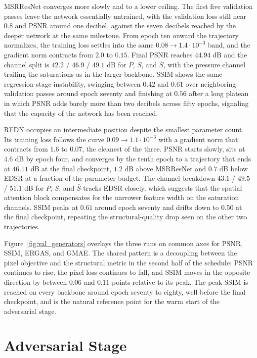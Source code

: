 MSRResNet converges more slowly and to a lower ceiling. The first five validation passes leave the network essentially untrained, with the validation loss still near $0.8$ and PSNR around one decibel, against the seven decibels reached by the deeper network at the same milestone. From epoch ten onward the trajectory normalizes, the training loss settles into the same $0.08 \to 1.4 \cdot 10^{-3}$ band, and the gradient norm contracts from $2.0$ to $0.15$. Final PSNR reaches $44.94$ dB and the channel split is $42.2$ / $46.9$ / $49.1$ dB for $P$, $S$, and $\bar{S}$, with the pressure channel trailing the saturations as in the larger backbone. SSIM shows the same regression-stage instability, swinging between $0.42$ and $0.61$ over neighboring validation passes around epoch seventy and finishing at $0.56$ after a long plateau in which PSNR adds barely more than two decibels across fifty epochs, signaling that the capacity of the network has been reached.

RFDN occupies an intermediate position despite the smallest parameter count. Its training loss follows the curve $0.09 \to 1.1 \cdot 10^{-3}$ with a gradient norm that contracts from $1.6$ to $0.07$, the cleanest of the three. PSNR starts slowly, sits at $4.6$ dB by epoch four, and converges by the tenth epoch to a trajectory that ends at $46.11$ dB at the final checkpoint, $1.2$ dB above MSRResNet and $0.7$ dB below EDSR at a fraction of the parameter budget. The channel breakdown $43.1$ / $49.5$ / $51.1$ dB for $P$, $S$, and $\bar{S}$ tracks EDSR closely, which suggests that the spatial attention block compensates for the narrower feature width on the saturation channels. SSIM peaks at $0.61$ around epoch seventy and drifts down to $0.50$ at the final checkpoint, repeating the structural-quality drop seen on the other two trajectories.

Figure~\ref{fig:val_generators} overlays the three runs on common axes for PSNR, SSIM, ERGAS, and GMAE. The shared pattern is a decoupling between the pixel objective and the structural metric in the second half of the schedule: PSNR continues to rise, the pixel loss continues to fall, and SSIM moves in the opposite direction by between $0.06$ and $0.11$ points relative to its peak. The peak SSIM is reached on every backbone around epoch seventy to eighty, well before the final checkpoint, and is the natural reference point for the warm start of the adversarial stage.


\section{Adversarial Stage}
\label{subsec:results_adversarial}


